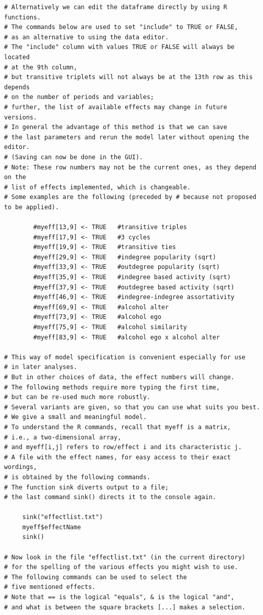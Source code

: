 \documentclass[a4paper,fleqn]{article}
\newcommand{\+}{\, + \,}
\begin{document}
{\begin{verbatim}
# Alternatively we can edit the dataframe directly by using R functions.
# The commands below are used to set "include" to TRUE or FALSE,
# as an alternative to using the data editor.
# The "include" column with values TRUE or FALSE will always be located
# at the 9th column,
# but transitive triplets will not always be at the 13th row as this depends
# on the number of periods and variables;
# further, the list of available effects may change in future versions.
# In general the advantage of this method is that we can save
# the last parameters and rerun the model later without opening the editor.
# (Saving can now be done in the GUI).
# Note: These row numbers may not be the current ones, as they depend on the
# list of effects implemented, which is changeable.
# Some examples are the following (preceded by # because not proposed to be applied).

        #myeff[13,9] <- TRUE   #transitive triples
        #myeff[17,9] <- TRUE   #3 cycles
        #myeff[19,9] <- TRUE   #transitive ties
        #myeff[29,9] <- TRUE   #indegree popularity (sqrt)
        #myeff[33,9] <- TRUE   #outdegree popularity (sqrt)
        #myeff[35,9] <- TRUE   #indegree based activity (sqrt)
        #myeff[37,9] <- TRUE   #outdegree based activity (sqrt)
        #myeff[46,9] <- TRUE   #indegree-indegree assortativity
        #myeff[69,9] <- TRUE   #alcohol alter
        #myeff[73,9] <- TRUE   #alcohol ego
        #myeff[75,9] <- TRUE   #alcohol similarity
        #myeff[83,9] <- TRUE   #alcohol ego x alcohol alter

# This way of model specification is convenient especially for use
# in later analyses.
# But in other choices of data, the effect numbers will change.
# The following methods require more typing the first time,
# but can be re-used much more robustly.
# Several variants are given, so that you can use what suits you best.
# We give a small and meaningful model.
# To understand the R commands, recall that myeff is a matrix,
# i.e., a two-dimensional array,
# and myeff[i,j] refers to row/effect i and its characteristic j.
# A file with the effect names, for easy access to their exact wordings,
# is obtained by the following commands.
# The function sink diverts output to a file;
# the last command sink() directs it to the console again.

     sink("effectlist.txt")
     myeff$effectName
     sink()

# Now look in the file "effectlist.txt" (in the current directory)
# for the spelling of the various effects you might wish to use.
# The following commands can be used to select the
# five mentioned effects.
# Note that == is the logical "equals", & is the logical "and",
# and what is between the square brackets [...] makes a selection.


\end{verbatim}}
\end{document}
